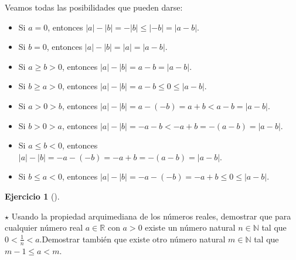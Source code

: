 \documentclass[
  a4paper,
]{scrreport}
\providecommand{\tightlist}{%
  \setlength{\itemsep}{0pt}\setlength{\parskip}{0pt}}\usepackage{longtable,booktabs,array}
\theoremstyle{definition}
\newtheorem{exercise}{Ejercicio}[chapter]
\theoremstyle{remark}
\begin{document}
\begin{tcolorbox}[enhanced jigsaw, coltitle=black, toptitle=1mm, colframe=quarto-callout-tip-color-frame, colbacktitle=quarto-callout-tip-color!10!white, breakable, opacityback=0, bottomtitle=1mm, opacitybacktitle=0.6, title=\textcolor{quarto-callout-tip-color}{\faLightbulb}\hspace{0.5em}{Solución}, arc=.35mm, leftrule=.75mm, toprule=.15mm, titlerule=0mm, bottomrule=.15mm, left=2mm, rightrule=.15mm, colback=white]

Veamos todas las posibilidades que pueden darse:

\begin{itemize}
\tightlist
\item
  Si \(a=0\), entonces \(|a|-|b|= -|b|\leq |-b| = |a-b|\).
\item
  Si \(b=0\), entonces \(|a|-|b|=|a|= |a-b|\).
\item
  Si \(a\geq b>0\), entonces \(|a|-|b|=a-b=|a-b|\).
\item
  Si \(b\geq a>0\), entonces \(|a|-|b|=a-b\leq 0\leq |a-b|\).
\item
  Si \(a>0>b\), entonces \(|a|-|b| = a-(-b) =a+b < a-b =|a-b|\).
\item
  Si \(b>0>a\), entonces \(|a|-|b| = -a-b < -a+b = -(a-b) = |a-b|\).
\item
  Si \(a\leq b<0\), entonces
  \(|a|-|b| = -a-(-b) = -a+b = -(a-b) = |a-b|\).
\item
  Si \(b\leq a<0\), entonces
  \(|a|-|b| = -a-(-b) = -a+b \leq 0 \leq |a-b|\).
\end{itemize}

\end{tcolorbox}

\begin{exercise}[]\protect\hypertarget{exr-propiedad-arquimediana-1}{}\label{exr-propiedad-arquimediana-1}

\(\star\) Usando la propiedad arquimediana de los números reales,
demostrar que para cualquier número real \(a\in\mathbb{R}\) con \(a>0\)
existe un número natural \(n\in \mathbb{N}\) tal que
\(0<\frac{1}{n}<a\).Demostrar también que existe otro número natural
\(m\in \mathbb{N}\) tal que \(m-1\leq a< m\).

\end{exercise}
\end{document}
